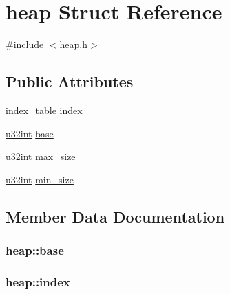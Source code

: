 \hypertarget{structheap}{}\section{heap Struct Reference}
\label{structheap}


{\ttfamily \#include $<$heap.\+h$>$}

\subsection*{Public Attributes}
\begin{DoxyCompactItemize}
\item 
\hyperlink{structindex__table}{index\+\_\+table} \hyperlink{structheap_a8fe6ce2a8b45088990071e9b1d35add2}{index}
\item 
\hyperlink{system_8h_a757de76cafbcddaac0d1632902fe4cb8}{u32int} \hyperlink{structheap_a744634662f1ffdb4d85632e68c063e51}{base}
\item 
\hyperlink{system_8h_a757de76cafbcddaac0d1632902fe4cb8}{u32int} \hyperlink{structheap_ad2e0262828735d6e437facbfce37d6b0}{max\+\_\+size}
\item 
\hyperlink{system_8h_a757de76cafbcddaac0d1632902fe4cb8}{u32int} \hyperlink{structheap_a7b4422774c5ca7ac8ed5ddfe95f5c8ec}{min\+\_\+size}
\end{DoxyCompactItemize}


\subsection{Member Data Documentation}
\hypertarget{structheap_a744634662f1ffdb4d85632e68c063e51}{}
\subsubsection[{base}]{ heap\+::base}\label{structheap_a744634662f1ffdb4d85632e68c063e51}
\hypertarget{structheap_a8fe6ce2a8b45088990071e9b1d35add2}{}
\subsubsection[{index}]{ heap\+::index}\label{structheap_a8fe6ce2a8b45088990071e9b1d35add2}
\hypertarget{structheap_ad2e0262828735d6e437facbfce37d6b0}{}

